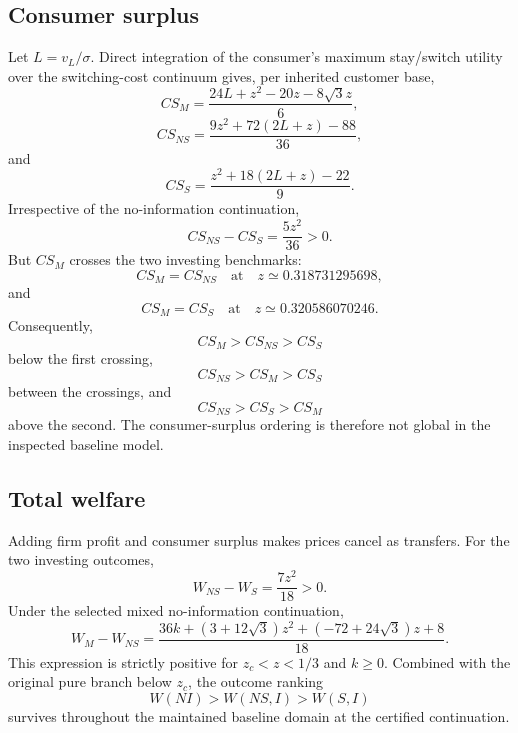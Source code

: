 \subsection{Consumer surplus}

Let \(L=v_L/\sigma\).  Direct integration of the consumer's maximum stay/switch utility over the switching-cost continuum gives, per inherited customer base,
\begin{equation}
CS_M=
\frac{24L+z^2-20z-8\sqrt3 z}{6},
\label{eq:CSM}
\end{equation}
\begin{equation}
CS_{NS}=
\frac{9z^2+72(2L+z)-88}{36},
\label{eq:CSNS}
\end{equation}
and
\begin{equation}
CS_S=
\frac{z^2+18(2L+z)-22}{9}.
\label{eq:CSS}
\end{equation}
Irrespective of the no-information continuation,
\[
CS_{NS}-CS_S=\frac{5z^2}{36}>0.
\]
But \(CS_M\) crosses the two investing benchmarks:
\[
CS_M=CS_{NS}
\quad\text{at}\quad
z\simeq0.318731295698,
\]
and
\[
CS_M=CS_S
\quad\text{at}\quad
z\simeq0.320586070246.
\]
Consequently,
\[
CS_M>CS_{NS}>CS_S
\]
below the first crossing,
\[
CS_{NS}>CS_M>CS_S
\]
between the crossings, and
\[
CS_{NS}>CS_S>CS_M
\]
above the second.  The consumer-surplus ordering is therefore not global in the inspected baseline model.

\subsection{Total welfare}

Adding firm profit and consumer surplus makes prices cancel as transfers.  For the two investing outcomes,
\begin{equation}
W_{NS}-W_S=\frac{7z^2}{18}>0.
\label{eq:welfareNSminusS}
\end{equation}
Under the selected mixed no-information continuation,
\begin{equation}
W_M-W_{NS}
=
\frac{
36k+(3+12\sqrt3)z^2+(-72+24\sqrt3)z+8
}{18}.
\label{eq:welfareMminusNS}
\end{equation}
This expression is strictly positive for \(z_c<z<1/3\) and \(k\ge0\).  Combined with the original pure branch below \(z_c\), the outcome ranking
\begin{equation}
W(NI)>W(NS,I)>W(S,I)
\label{eq:welfareorder}
\end{equation}
survives throughout the maintained baseline domain at the certified continuation.

